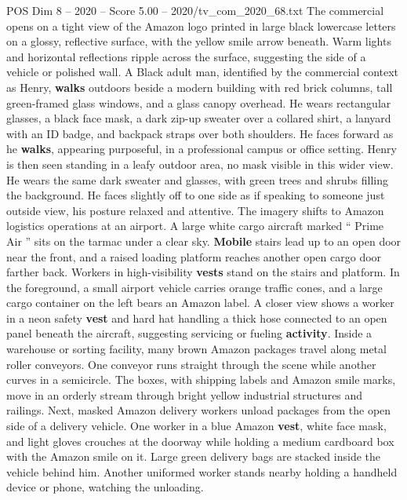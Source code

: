 \begin{textsample}{POS Dim 8 – 2020 – Score 5.00 – 2020/tv\_com\_2020\_68.txt}  \label{ex:f8_pos_060}
The commercial opens on a tight view of the Amazon logo printed in large black lowercase letters on a glossy, reflective surface, with the yellow smile arrow beneath.
Warm lights and horizontal reflections ripple across the surface, suggesting the side of a vehicle or polished wall.
A Black adult man, identified by the commercial context as Henry, \textbf{walks} outdoors beside a modern building with red brick columns, tall green-framed glass windows, and a glass canopy overhead.
He wears rectangular glasses, a black face mask, a dark zip-up sweater over a collared shirt, a lanyard with an ID badge, and backpack straps over both shoulders.
He faces forward as he \textbf{walks}, appearing purposeful, in a professional campus or office setting.
Henry is then seen standing in a leafy outdoor area, no mask visible in this wider view.
He wears the same dark sweater and glasses, with green trees and shrubs filling the background.
He faces slightly off to one side as if speaking to someone just outside view, his posture relaxed and attentive.
The imagery shifts to Amazon logistics operations at an airport.
A large white cargo aircraft marked “ Prime Air ” sits on the tarmac under a clear sky. \textbf{Mobile} stairs lead up to an open door near the front, and a raised loading platform reaches another open cargo door farther back.
Workers in high-visibility \textbf{vests} stand on the stairs and platform.
In the foreground, a small airport vehicle carries orange traffic cones, and a large cargo container on the left bears an Amazon label.
A closer view shows a worker in a neon safety \textbf{vest} and hard hat handling a thick hose connected to an open panel beneath the aircraft, suggesting servicing or fueling \textbf{activity}.
Inside a warehouse or sorting facility, many brown Amazon packages travel along metal roller conveyors.
One conveyor runs straight through the scene while another curves in a semicircle.
The boxes, with shipping labels and Amazon smile marks, move in an orderly stream through bright yellow industrial structures and railings.
Next, masked Amazon delivery workers unload packages from the open side of a delivery vehicle.
One worker in a blue Amazon \textbf{vest}, white face mask, and light gloves crouches at the doorway while holding a medium cardboard box with the Amazon smile on it.
Large green delivery bags are stacked inside the vehicle behind him.
Another uniformed worker stands nearby holding a handheld device or phone, watching the unloading.

\end{textsample}
